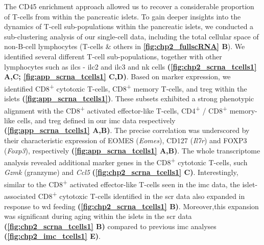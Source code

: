 
\par The CD45 enrichment approach allowed us to recover a considerable proportion of T-cells from within the pancreatic islets. To gain deeper insights into the dynamics of T-cell sub-populations within the pancreatic islets, we conducted a sub-clustering analysis of our single-cell data, including the total cellular space of non-B-cell lymphocytes (T-cells \& others in \textbf{\autoref{fig:chp2_fullscRNA} B}). We identified several different T-cell sub-populations, together with other lymphocytes such as \glspl{ilc} -  \gls{ilc}2 and \gls{ilc}3 and \gls{nk} cells \textbf{(\autoref{fig:chp2_scrna_tcells1} A,C; \autoref{fig:app_scrna_tcells1} C,D)}. %
Based on marker expression, we identified  CD8\textsuperscript{+} cytotoxic T-cells, CD8\textsuperscript{+} memory T-cells, and \gls{treg} within the islets \textbf{(\autoref{fig:app_scrna_tcells1})}. These subsets exhibited a strong phenotypic alignment with the CD8\textsuperscript{+} activated effector-like T-cells, CD4\textsuperscript{+} / CD8\textsuperscript{+} memory-like cells, and \gls{treg} defined in our \gls{imc} data respectively \textbf{(\autoref{fig:app_scrna_tcells1} A,B)}. The precise correlation was underscored by their characteristic expression of EOMES (\textit{Eomes}), CD127 (\textit{Il7r}) and FOXP3 (\textit{Foxp3}), respectively \textbf{(\autoref{fig:app_scrna_tcells1} A,B)}. The whole transcriptome analysis revealed additional marker genes in the CD8\textsuperscript{+} cytotoxic T-cells, such \textit{Gzmk} (granzyme) and \textit{Ccl5} \textbf{(\autoref{fig:chp2_scrna_tcells1} C)}. Interestingly, similar to the CD8\textsuperscript{+} activated effector-like T-cells seen in the \gls{imc} data, the islet-associated CD8\textsuperscript{+} cytotoxic T-cells identified in the \gls{scr} data also expanded in response to \gls{wd} feeding \textbf{(\autoref{fig:chp2_scrna_tcells1} B)}. Moreover,this expansion was significant during aging within the islets in the \gls{scr} data \textbf{(\autoref{fig:chp2_scrna_tcells1} B)} compared to previous \gls{imc} analyses \textbf{(\autoref{fig:chp2_imc_tcells1} E)}.\\

